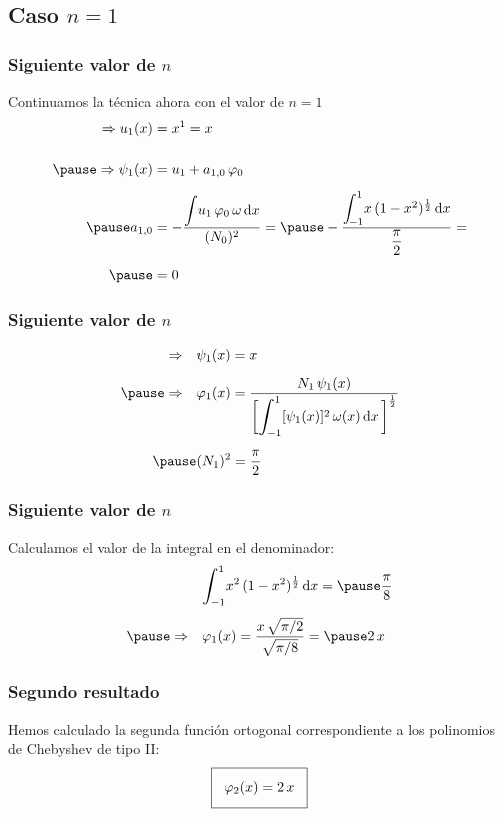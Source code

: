 \documentclass[12pt]{beamer}
\begin{document}
\subsection{Caso \texorpdfstring{$n=1$}{n=1}}

\begin{frame}
\frametitle{Siguiente valor de $n$}
Continuamos la técnica ahora con el valor de $n = 1$
\pause
\begin{eqnarray*}
\begin{aligned}
\Rightarrow u_{1} (x) &= x^{1} = x \\[0.5cm] \pause
\Rightarrow \psi_{1} (x) &=  u_{1} + a_{1,0} \, \varphi_{0} \\[0.5em] \pause
a_{1,0} &= - \dfrac{\scaleint{5ex} u_{1} \, \varphi_{0} \, \omega \dd{x}}{(N_{0})^{2}} = \pause
- \dfrac{\scaleint{5ex}_{\bs -1}^{1} x \, (1 - x^{2})^{\frac{1}{2}} \dd{x}}{\dfrac{\pi}{2}} = \\[0.5em] \pause
&= 0
\end{aligned}
\end{eqnarray*}    
\end{frame}
\begin{frame}
\frametitle{Siguiente valor de $n$}
\begin{eqnarray*}
\begin{aligned}
\Rightarrow \quad &\psi_{1} (x) =  x \\[0.5em] \pause
\Rightarrow \quad &\varphi_{1} (x) = \dfrac{N_{1} \, \psi_{1} (x)}{\bigg[ \scaleint{6ex}_{\bs -1}^{1} [\psi_{1} (x)]^{2} \, \omega (x) \dd{x} \bigg]^{\frac{1}{2}}} \\[0.5em] \pause
&(N_{1})^{2} = \dfrac{\pi}{2}
\end{aligned}
\end{eqnarray*}    
\end{frame}
\begin{frame}
\frametitle{Siguiente valor de $n$}
Calculamos el valor de la integral en el denominador:
\pause
\begin{eqnarray*}
\begin{aligned}
&\scaleint{6ex}_{\bs -1}^{1} x^{2} \, (1 - x^{2})^{\frac{1}{2}} \dd{x} = \pause \dfrac{\pi}{8} \\[0.4em] \pause
\Rightarrow \quad &\varphi_{1} (x) = \dfrac{x \, \sqrt{\pi/2}}{\sqrt{\pi/8}} = \pause 2 \, x
\end{aligned}
\end{eqnarray*}    
\end{frame}
\begin{frame}
\frametitle{Segundo resultado}
Hemos calculado la segunda función ortogonal correspondiente a los polinomios de Chebyshev de tipo II:
\pause
\begin{align*}
\setlength{\fboxsep}{3\fboxsep}\boxed{
\varphi_{2} (x) = 2 \, x}
\end{align*}
\end{frame}
\end{document}
